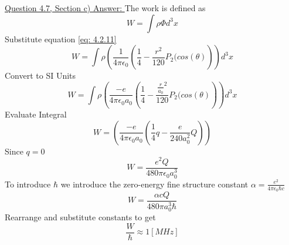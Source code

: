 \documentclass[12pt]{article}
\begin{document}
    \underline{Question 4.7, Section c) Answer: }
    \newline The work is defined as
    \begin{equation} \label{eq: 4.3.1}
        W = \int \rho \Phi d^3x
    \end{equation}
    Substitute equation \ref{eq: 4.2.11}
    \begin{equation} \label{eq: 4.3.2}
        W = \int \rho \left(\frac{1}{4 \pi \epsilon_0} \left(\frac{1}{4} - \frac{r^2}{120} P_2(cos(\theta) \right) \right) d^3x
    \end{equation}
    Convert to SI Units
    \begin{equation} \label{eq: 4.3.3}
        W = \int \rho \left(\frac{-e}{4 \pi \epsilon_0 a_0} \left(\frac{1}{4} - \frac{{\frac{r}{a_0}}^2}{120} P_2(cos(\theta) \right) \right) d^3x
    \end{equation}    
    Evaluate Integral
    \begin{equation} \label{eq: 4.3.4}
        W = \left(\frac{-e}{4 \pi \epsilon_0 a_0} \left(\frac{1}{4} q - \frac{e}{240 a_0^2} Q \right) \right)
    \end{equation}
    Since $q = 0$
    \begin{equation} \label{eq: 4.3.5}
        W = \frac{e^2 Q}{480 \pi \epsilon_0 a_0^3} 
    \end{equation}
    To introduce $\hbar$ we introduce the zero-energy fine structure constant $\alpha = \frac{e^2}{4 \pi \epsilon_0 \hbar c}$
    \begin{equation} \label{eq: 4.3.6}
        W = \frac{\alpha c Q}{480 \pi a_0^3 \hbar}
    \end{equation}
    Rearrange and substitute constants to get
    \begin{equation} \label{eq: 4.3.7}
        \frac{W}{\hbar} \approx 1 [MHz]
    \end{equation}
\end{document}
